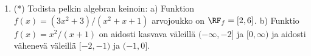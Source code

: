 \begin{enumerate}
\item (*) \label{H-IV-1: funktioalgebran haasteita}
Todista pelkin algebran keinoin: \vspace{1mm}\newline
a) Funktion $f(x)=(3x^2+3)/(x^2+x+1)$ arvojoukko on $\RF_f=[2,6]$. \newline
b) Funktio $f(x)=x^2/(x+1)$ on aidosti kasvava väleillä $(-\infty,-2]$ ja $[0,\infty)$
ja aidosti vähenevä väleillä $[-2,-1)$ ja $(-1,0]$.

\end{enumerate}